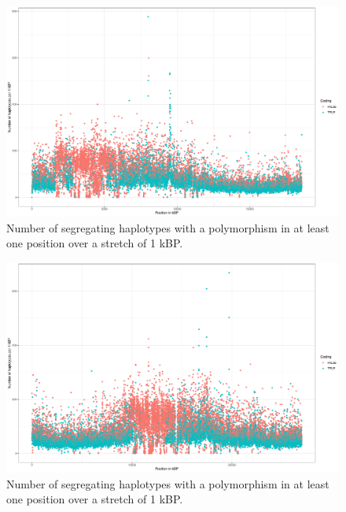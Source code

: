 \begin{figure}[th]
\centering
\includegraphics[height=.55\textheight, width=1.1\textwidth]{Figures/chr4_hap}
\decoRule
\caption[Haplotype strutcture of chromosome 4 of \textit{A. thaliana}]{Number of segregating haplotypes with a polymorphism in at least one position over a stretch of 1 kBP. }
\label{fig:chr4}
\end{figure}


\begin{figure}[th]
\centering
\includegraphics[height=.55\textheight, width=1.1\textwidth]{Figures/chr5_hap}
\decoRule
\caption[Haplotype strutcture of chromosome 5 of \textit{A. thaliana}]{Number of segregating haplotypes with a polymorphism in at least one position over a stretch of 1 kBP. }
\label{fig:chr5}
\end{figure}



